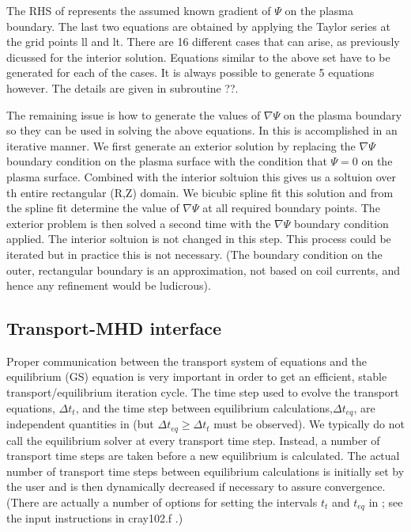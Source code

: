 The RHS of  represents the assumed known gradient of $\Psi$ on the
plasma boundary. The last two equations are obtained by applying  the Taylor
series at the grid points ll and lt. There are 16 different cases that can
arise, as previously dicussed for the interior solution. Equations similar to
the above set have to be generated for each of the cases. It is always possible
to generate 5 equations however. The details are given in subroutine ??.

The remaining issue is how to generate the values of $\nabla \Psi $ on the
plasma boundary so they can be used in solving the above equations. In \ot this
is accomplished in an iterative manner. We first generate an exterior solution
by replacing the  $\nabla \Psi $ boundary condition on the plasma surface with
the condition that $\Psi = 0$ on the plasma surface. Combined with the interior
soltuion this gives us a soltuion over th entire rectangular (R,Z) domain. We
bicubic spline fit this solution and from the spline fit determine the value of
$\nabla \Psi $ at all required boundary points. The exterior problem is then
solved a second time with the  $\nabla \Psi $ boundary condition applied. The
interior soltuion is not changed in this step. This process could be iterated
but in practice this is not necessary.  (The boundary condition on the outer,
rectangular boundary  is an approximation, not based on coil currents, and hence
any refinement would be ludicrous).

\subsection{Transport-MHD interface}

Proper communication between the transport system of equations and the
equilibrium (GS) equation is very important in order to get an efficient, stable
transport/equilibrium iteration cycle. The time step used to evolve the
transport equations, $\Delta t_t$, and the time step between equilibrium
calculations,$\Delta t_{eq}$, are independent quantities in \ot (but $ \Delta
t_{eq} \ge \Delta t_t$ must be observed).  We typically do not call the
equilibrium solver at every transport time step. Instead, a number of transport
time steps are taken before a new equilibrium is calculated. The actual number
of transport time steps between equilibrium calculations is initially set by the
user and is then dynamically decreased if necessary to assure convergence.
(There are actually a number of  options for setting the intervals $t_t$ and
$t_{eq}$ in \ot; see the input instructions in cray102.f .)

